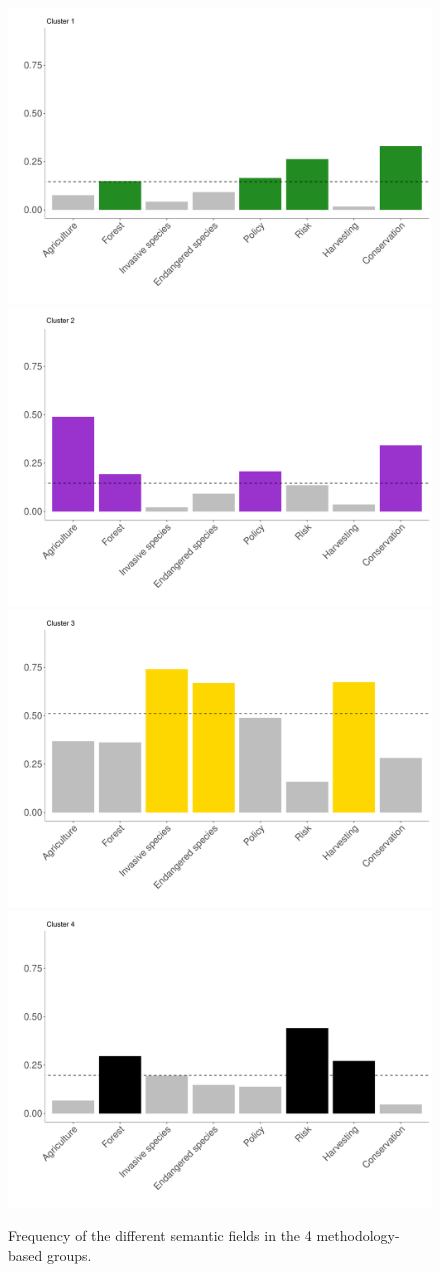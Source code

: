 \begin{figure}[h]
\centering
\includegraphics[width = .45\textwidth]{figures/review/lexical_profile_cluster_kmodes_bg2.pdf}
\includegraphics[width = .45\textwidth]{figures/review/lexical_profile_cluster_kmodes_bg1.pdf}\\
\includegraphics[width = .45\textwidth]{figures/review/lexical_profile_cluster_kmodes_bg3.pdf}
\includegraphics[width = .45\textwidth]{figures/review/lexical_profile_cluster_kmodes_bg4.pdf}
\caption{\label{fig:semantic-fields} Frequency of the different semantic fields in the 4 methodology-based  groups.}
\end{figure}
\clearpage

